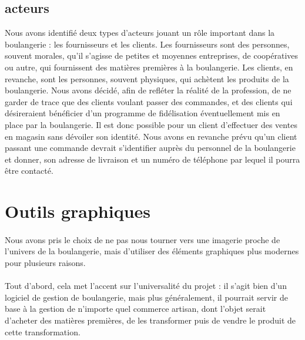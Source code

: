     \subsection{acteurs}
        Nous avons identifié deux types d'acteurs jouant un rôle important dans
        la boulangerie : les fournisseurs et les clients.
        Les fournisseurs sont des personnes, souvent morales, qu'il s'agisse
        de petites et moyennes entreprises, de coopératives ou autre, qui
        fournissent des matières premières à la boulangerie.
        Les clients, en revanche, sont les personnes, souvent physiques, qui
        achètent les produits de la boulangerie.
        Nous avons décidé, afin de refléter la réalité de la profession, de 
        ne garder de trace que des clients voulant passer des commandes, et des
        clients qui désireraient bénéficier d'un programme de fidélisation
        éventuellement mis en place par la boulangerie.
        Il est donc possible pour un client d'effectuer des ventes en magasin
        sans dévoiler son identité.
        Nous avons en revanche prévu qu'un client passant une commande devrait
        s'identifier auprès du personnel de la boulangerie et donner, son
        adresse de livraison et un numéro de téléphone par lequel il pourra être
        contacté.



\section{Outils graphiques}
    \paragraph{}
        Nous avons pris le choix de ne pas nous tourner vers une imagerie
        proche de l'univers de la boulangerie, mais d'utiliser des éléments
        graphiques plus modernes pour plusieurs raisons.
    \paragraph{}
        Tout d'abord, cela met l'accent sur l'universalité du projet :
        il s'agit bien d'un logiciel de gestion de boulangerie, mais plus
        généralement, il pourrait servir de base à la gestion de n'importe
        quel commerce artisan, dont l'objet serait d'acheter des matières
        premières, de les transformer puis de vendre le produit de cette
        transformation.
